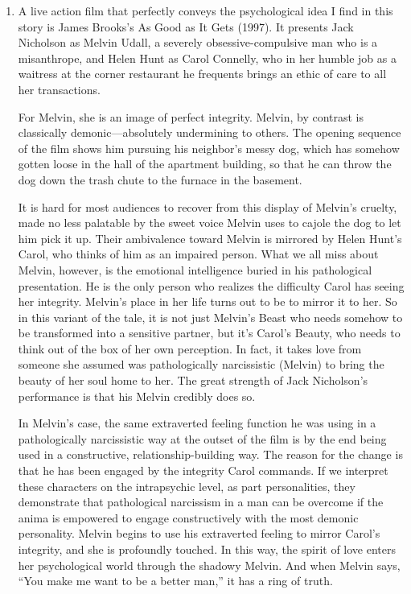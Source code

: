 \begin{enumerate}
\item {} A live action film that perfectly
conveys the psychological idea I find in this story is James Brooks’s As Good
as It Gets (1997). It presents Jack Nicholson as Melvin Udall, a severely
obsessive-compulsive man who is a misanthrope, and Helen Hunt as Carol
Connelly, who in her humble job as a waitress at the corner restaurant he
frequents brings an ethic of care to all her transactions.

For Melvin, she is an image of perfect integrity. Melvin, by contrast is
classically demonic—absolutely undermining to others. The opening sequence of
the film shows him pursuing his neighbor’s messy dog, which has somehow gotten
loose in the hall of the apartment building, so that he can throw the dog down
the trash chute to the furnace in the basement.

It is hard for most audiences to recover from this display of Melvin’s cruelty,
made no less palatable by the sweet voice Melvin uses to cajole the dog to let
him pick it up. Their ambivalence toward Melvin is mirrored by Helen Hunt’s
Carol, who thinks of him as an impaired person. What we all miss about Melvin,
however, is the emotional intelligence buried in his pathological presentation.
He is the only person who realizes the difficulty Carol has seeing her
integrity. Melvin’s place in her life turns out to be to mirror it to her. So
in this variant of the tale, it is not just Melvin’s Beast who needs somehow to
be transformed into a sensitive partner, but it’s Carol’s Beauty, who needs to
think out of the box of her own perception. In fact, it takes love from someone
she assumed was pathologically narcissistic (Melvin) to bring the beauty of her
soul home to her. The great strength of Jack Nicholson’s performance is that
his Melvin credibly does so.

In Melvin’s case, the same extraverted feeling function he was using in a
pathologically narcissistic way at the outset of the film is by the end being
used in a constructive, relationship-building way. The reason for the change is
that he has been engaged by the integrity Carol commands. If we interpret these
characters on the intrapsychic level, as part personalities, they demonstrate
that pathological narcissism in a man can be overcome if the anima is empowered
to engage constructively with the most demonic personality. Melvin begins to
use his extraverted feeling to mirror Carol’s integrity, and she is profoundly
touched. In this way, the spirit of love enters her psychological world through
the shadowy Melvin. And when Melvin says, “You make me want to be a better
man,” it has a ring of truth.


\end{enumerate}
